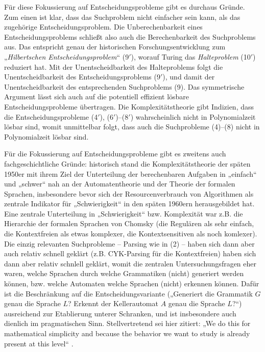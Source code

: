 Für diese Fokussierung auf Entscheidungsprobleme gibt es durchaus Gründe. Zum einen ist klar, dass das Suchproblem nicht einfacher sein kann, als das zugehörige Entscheidungsproblem. Die Unberechenbarkeit eines Entscheidungsproblems schließt also auch die Berechenbarkeit des Suchproblems aus. Das entspricht genau der historischen Forschungsentwicklung zum „\emph{Hilbertschen Entscheidungsproblem}“ (9$'$), worauf Turing das \emph{Halteproblem} (10$'$) reduziert hat. Mit der Unentscheidbarkeit des  Halteproblems folgt die Unentscheidbarkeit des Entscheidungsproblems (9$'$), und damit der Unentscheidbarkeit des entsprechenden Suchproblems (9). 
Das symmetrische Argument lässt sich auch auf die potentiell effizient lösbare Entscheidungsprobleme übertragen. Die Komplexitätstheorie gibt Indizien, dass die Entscheidungsprobleme (4$'$), (6$'$)--(8$'$) wahrscheinlich nicht in Polynomialzeit lösbar sind, womit unmittelbar folgt, dass auch die Suchprobleme (4)--(8) nicht in Polynomialzeit lösbar sind.

Für die Fokussierung auf Entscheidungsprobleme gibt es zweitens auch fachgeschichtliche Gründe: historisch stand die Komplexitätstheorie der späten 1950er mit ihrem Ziel der Unterteilung der berechenbaren Aufgaben in „einfach“ und „schwer“ nah an der Automatentheorie und der Theorie der formalen Sprachen, insbesondere bevor sich der Resourcenverbrauch von Algorithmen als zentrale Indikator für „Schwierigkeit“ in den späten 1960ern herausgebildet hat. Eine zentrale Unterteilung in „Schwierigkeit“ bzw. Komplexität war z.B. die Hierarchie der formalen Sprachen von Chomsky (die Regulären als sehr einfach, die Kontextfreien als etwas komplexer, die Kontextsensitiven als noch komlexer). %
Die einzig relevanten Suchprobleme -- Parsing wie in (2) -- haben sich dann aber auch relativ schnell geklärt (z.B. CYK-Parsing für die Kontextfreien) haben sich dann aber relativ schnlell geklärt, womit die zentralen Untersuchungsfragen eher waren, welche Sprachen durch welche Grammatiken (nicht) generiert werden können, bzw. welche Automaten welche Sprachen (nicht) erkennen können. Dafür ist die Beschränkung auf die Entscheidungsvariante („Generiert die Grammatik $G$ genau die Sprache $L$? Erkennt der Kellerautomat $A$ genau die Sprache $L$?“) ausreichend zur Etablierung unterer Schranken, und ist insbesondere auch dienlich im pragmatischen Sinn. Stellvertretend sei hier \citeauthor{kozen_automata_1997} zitiert: „We do this for mathematical simplicity and because the behavior we want to study is already present at this level“ \textcite*[7]{kozen_automata_1997}.

